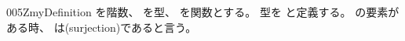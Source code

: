 \documentclass[index]{subfiles}
\begin{document}
\begin{myBlock}{005Z}{myDefinition}
  を階数、
  を型、
  を関数とする。
  型を
  と定義する。
  の要素がある時、
  は(surjection)であると言う。
\end{myBlock}
\end{document}

